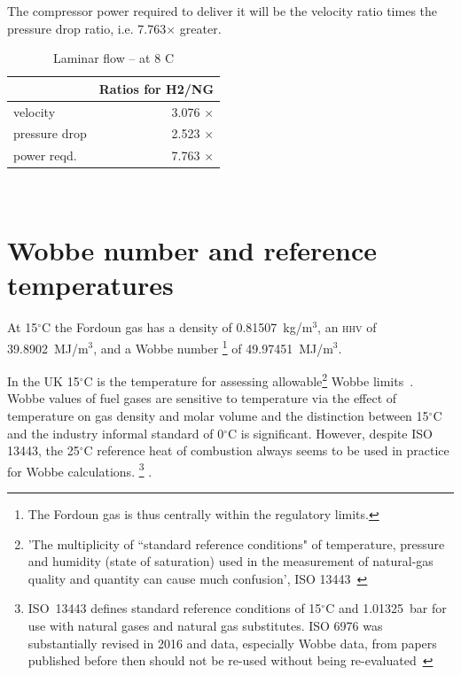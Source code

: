 \documentclass[5p]{elsarticle} %
\begin{document}
The compressor power required to deliver it will be the velocity ratio times the pressure drop ratio, i.e. 7.763$\times$ greater.

\begin{table}[htb]
\centering
\caption{\label{tab:laminar}Laminar flow -- at 8 C}
\begin{tabular}{l|r}
 & Ratios for H2/NG \\\hline
velocity & 3.076 $\times$  \\
pressure drop & 2.523 $\times$  \\
power reqd. & 7.763 $\times$  \\
\hline
\end{tabular}
\end{table}
~\\

\newpage %

\section{Wobbe number and reference temperatures}
\label{sec:wobbe}
At 15$^\circ$C the Fordoun gas has  a density of 0.81507~kg/m$^3$, an \textsc{hhv} of 39.8902~MJ/m$^3$, and a Wobbe number
\footnote{The Fordoun gas is thus
centrally within the regulatory limits.
} of 49.97451~MJ/m$^3$.

In the UK 15$^\circ$C is the temperature for assessing allowable\footnote{'The multiplicity of ``standard reference conditions" of temperature, pressure and humidity (state of saturation) used in the measurement of natural-gas quality and quantity can cause much confusion', ISO 13443~\citep{ISO13443}} Wobbe limits~\citep{GS(M)2023,Lander2017}. Wobbe values of fuel gases are sensitive to temperature via the effect of temperature on gas density and molar volume and the distinction between 15$^\circ$C and the industry informal standard of 0$^\circ$C is significant. However, despite ISO 13443, the 25$^\circ$C reference heat  of combustion always seems to be used in practice for Wobbe calculations.
\footnote{ ISO~13443  defines standard reference conditions of 15$^\circ$C and 1.01325~bar for use with natural gases and natural gas substitutes. ISO 6976 was substantially revised in 2016 and data, especially Wobbe data, from papers published before then should not be re-used without being re-evaluated~\citep{Lander2017}
} . 
\end{document}
